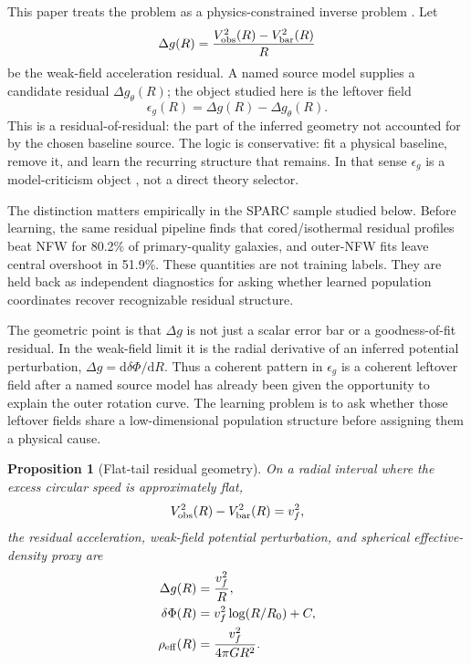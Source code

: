 \documentclass[10pt,twocolumn]{article}
\newcommand{\dd}{\mathrm{d}}
\newcommand{\epsg}{\epsilon_g}
\newcommand{\Dg}{\Delta g}
\newtheorem{proposition}{Proposition}
\begin{document}
This paper treats the problem as a physics-constrained inverse problem
\citep{Tarantola2005}. Let
\begin{equation}
\Dg(R)=\frac{V_{\rm obs}^2(R)-V_{\rm bar}^2(R)}{R}
\end{equation}
be the weak-field acceleration residual. A named source model supplies a
candidate residual $\Dg_{\theta}(R)$; the object studied here is the leftover
field
\begin{equation}
\epsg(R)=\Dg(R)-\Dg_{\theta}(R).
\end{equation}
This is a residual-of-residual: the part of the inferred geometry not accounted
for by the chosen baseline source. The logic is conservative: fit a physical
baseline, remove it, and learn the recurring structure that remains. In that
sense $\epsg$ is a model-criticism object \citep{Gelman1996}, not a direct
theory selector.

The distinction matters empirically in the SPARC sample studied below. Before
learning, the same residual pipeline finds that cored/isothermal residual
profiles beat NFW for 80.2\% of primary-quality galaxies, and outer-NFW fits
leave central overshoot in 51.9\%. These quantities are not training labels.
They are held back as independent diagnostics for asking whether learned
population coordinates recover recognizable residual structure.

The geometric point is that $\Dg$ is not just a scalar error bar or a
goodness-of-fit residual. In the weak-field limit it is the radial derivative
of an inferred potential perturbation, $\Dg=\dd\delta\Phi/\dd R$. Thus a
coherent pattern in $\epsg$ is a coherent leftover field after a named source
model has already been given the opportunity to explain the outer rotation
curve. The learning problem is to ask whether those leftover fields share a
low-dimensional population structure before assigning them a physical cause.

\begin{proposition}[Flat-tail residual geometry]
On a radial interval where the excess circular speed is approximately flat,
\begin{equation}
V_{\rm obs}^2(R)-V_{\rm bar}^2(R)=v_f^2 ,
\end{equation}
the residual acceleration, weak-field potential perturbation, and spherical
effective-density proxy are
\begin{align}
\Dg(R)&=\frac{v_f^2}{R},\\
\delta\Phi(R)&=v_f^2\log(R/R_0)+C,\\
\rho_{\rm eff}(R)&=\frac{v_f^2}{4\pi G R^2}.
\end{align}
\end{proposition}
\end{document}
